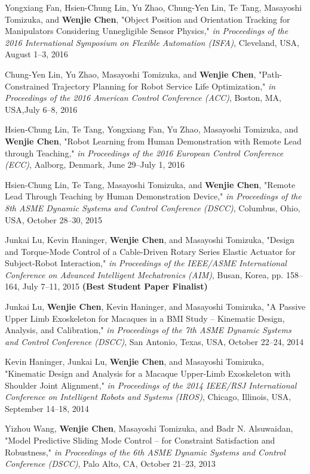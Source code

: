 \documentclass{res}
\begin{document}
\begin{resume}
\begin{etaremune}[start=26]
    \item Yongxiang Fan, Hsien-Chung Lin, Yu Zhao, Chung-Yen Lin, Te Tang, Masayoshi Tomizuka, and \textbf{Wenjie Chen}, "Object Position and Orientation Tracking for Manipulators Considering Unnegligible Sensor Physics," \emph{in Proceedings of the 2016 International Symposium on Flexible Automation (ISFA)}, Cleveland, USA, August 1--3, 2016
    \item Chung-Yen Lin, Yu Zhao, Masayoshi Tomizuka, and \textbf{Wenjie Chen}, "Path-Constrained Trajectory Planning for Robot Service Life Optimization," \emph{in Proceedings of the 2016 American Control Conference (ACC)}, Boston, MA, USA,July 6--8, 2016
    \item Hsien-Chung Lin, Te Tang, Yongxiang Fan, Yu Zhao, Masayoshi Tomizuka, and \textbf{Wenjie Chen}, "Robot Learning from Human Demonstration with Remote Lead through Teaching," \emph{in Proceedings of the 2016 European Control Conference (ECC)}, Aalborg, Denmark, June 29--July 1, 2016
    \item Hsien-Chung Lin, Te Tang, Masayoshi Tomizuka, and \textbf{Wenjie Chen}, "Remote Lead Through Teaching by Human Demonstration Device," \emph{in Proceedings of the 8th ASME Dynamic Systems and Control Conference (DSCC)}, Columbus, Ohio, USA, October 28--30, 2015
    \item Junkai Lu, Kevin Haninger, \textbf{Wenjie Chen}, and Masayoshi Tomizuka, "Design and Torque-Mode Control of a Cable-Driven Rotary Series Elastic Actuator for Subject-Robot Interaction," \emph{in Proceedings of the IEEE/ASME International Conference on Advanced Intelligent Mechatronics (AIM)}, Busan, Korea, pp. 158--164, July 7--11, 2015 \textbf{(Best Student Paper Finalist)} 
    \item Junkai Lu, \textbf{Wenjie Chen}, Kevin Haninger, and Masayoshi Tomizuka, "A Passive Upper Limb Exoskeleton for Macaques in a BMI Study -- Kinematic Design, Analysis, and Calibration," \emph{in Proceedings of the 7th ASME Dynamic Systems and Control Conference (DSCC)}, San Antonio, Texas, USA, October 22--24, 2014
    \item Kevin Haninger, Junkai Lu, \textbf{Wenjie Chen}, and Masayoshi Tomizuka, "Kinematic Design and Analysis for a Macaque Upper-Limb Exoskeleton with Shoulder Joint Alignment," \emph{in Proceedings of the 2014 IEEE/RSJ International Conference on Intelligent Robots and Systems (IROS)}, Chicago, Illinois, USA, September 14--18, 2014
    \item Yizhou Wang, \textbf{Wenjie Chen}, Masayoshi Tomizuka, and Badr N. Alsuwaidan, "Model Predictive Sliding Mode Control -- for Constraint Satisfaction and Robustness," \emph{in Proceedings of the 6th ASME Dynamic Systems and Control Conference (DSCC)}, Palo Alto, CA, October 21--23, 2013

\end{etaremune}
\end{resume}
\end{document}
